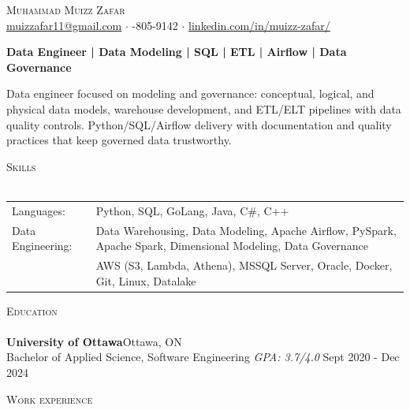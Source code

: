 \documentclass[a4paper]{article}
\newcommand{\lineunder} {
    \vspace*{-8pt} \\
    \hspace*{-18pt} \hrulefill \\
}
\newcommand{\header} [1] {
    {\hspace*{-18pt}\vspace*{6pt} \textsc{#1}}
    \vspace*{-6pt} \lineunder
}
\begin{document}
\vspace*{-40pt}

\vspace*{-10pt}
\begin{center}
	{\Huge \scshape {Muhammad Muizz Zafar}}\\
	\faSend \space \href{mailto:muizzafar11@gmail.com}{muizzafar11@gmail.com} $\cdot$ \faPhoneSquare {}-805-9142 $\cdot$ \faLinkedinSquare \space \href{https://www.linkedin.com/in/muizz-zafar/}{linkedin.com/in/muizz-zafar/}
	\\
\end{center}

\vspace{-5pt}
\begin{center}
\textbf{Data Engineer | Data Modeling | SQL | ETL | Airflow | Data Governance}
\end{center}
\begin{center}
Data engineer focused on modeling and governance: conceptual, logical, and physical data models, warehouse development, and ETL/ELT pipelines with data quality controls. Python/SQL/Airflow delivery with documentation and quality practices that keep governed data trustworthy.
\end{center}

\header{Skills}
\begin{tabular}{ l l }
	Languages: 
& Python, SQL, GoLang, Java, C\#, C++ \\

Data Engineering: 
& Data Warehousing, Data Modeling, Apache Airflow, PySpark, Apache Spark, Dimensional Modeling, Data Governance\\
& AWS (S3, Lambda, Athena), MSSQL Server, Oracle, Docker, Git, Linux, Datalake

\end{tabular}

\header{Education}
\textbf{University of Ottawa}\hfill Ottawa, ON\\
Bachelor of Applied Science, Software Engineering \textit{GPA: 3.7/4.0} \hfill Sept 2020 - Dec 2024\\
\vspace{2mm}

\header{Work experience}
\vspace{1.5mm}
\end{document}
